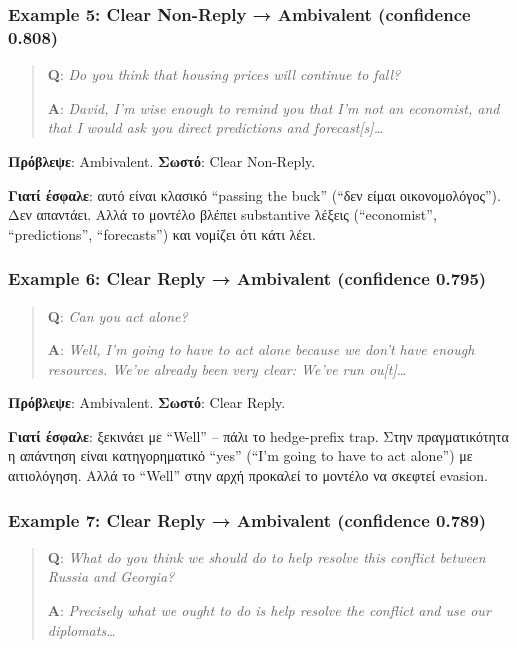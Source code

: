 \documentclass[12pt]{fphw}
\begin{document}
\subsubsection{Example 5: Clear Non-Reply → Ambivalent (confidence 0.808)}

\begin{quote}
\textbf{Q}: \emph{Do you think that housing prices will continue to fall?}

\textbf{A}: \emph{David, I'm wise enough to remind you that I'm not an economist, and that I would ask you direct predictions and forecast[s]\dots}
\end{quote}

\textbf{Πρόβλεψε}: Ambivalent. \textbf{Σωστό}: Clear Non-Reply.

\textbf{Γιατί έσφαλε}: αυτό είναι κλασικό ``passing the buck'' (``δεν είμαι οικονομολόγος''). Δεν απαντάει. Αλλά το μοντέλο βλέπει substantive λέξεις (``economist'', ``predictions'', ``forecasts'') και νομίζει ότι κάτι λέει.

\subsubsection{Example 6: Clear Reply → Ambivalent (confidence 0.795)}

\begin{quote}
\textbf{Q}: \emph{Can you act alone?}

\textbf{A}: \emph{Well, I'm going to have to act alone because we don't have enough resources. We've already been very clear: We've run ou[t]\dots}
\end{quote}

\textbf{Πρόβλεψε}: Ambivalent. \textbf{Σωστό}: Clear Reply.

\textbf{Γιατί έσφαλε}: ξεκινάει με ``Well'' -- πάλι το hedge-prefix trap. Στην πραγματικότητα η απάντηση είναι κατηγορηματικό ``yes'' (``I'm going to have to act alone'') με αιτιολόγηση. Αλλά το ``Well'' στην αρχή προκαλεί το μοντέλο να σκεφτεί evasion.

\subsubsection{Example 7: Clear Reply → Ambivalent (confidence 0.789)}

\begin{quote}
\textbf{Q}: \emph{What do you think we should do to help resolve this conflict between Russia and Georgia?}

\textbf{A}: \emph{Precisely what we ought to do is help resolve the conflict and use our diplomats\dots}
\end{quote}
\end{document}
